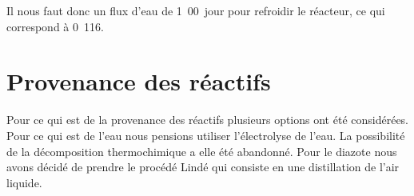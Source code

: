 Il nous faut donc un flux d'eau de \unit{1.00}{\meter\cubed\per jour} pour refroidir le réacteur, ce qui correspond à \unit{0.116}{\meter\cubed\per\second}.

\section{Provenance des réactifs}
 
Pour ce qui est de la provenance des réactifs plusieurs options ont été considérées. Pour ce qui est de l'eau nous pensions utiliser l'électrolyse de l'eau. La possibilité de la décomposition thermochimique a elle été abandonné. Pour le diazote nous avons décidé de prendre le procédé Lindé qui consiste en une distillation de l'air liquide.




%
